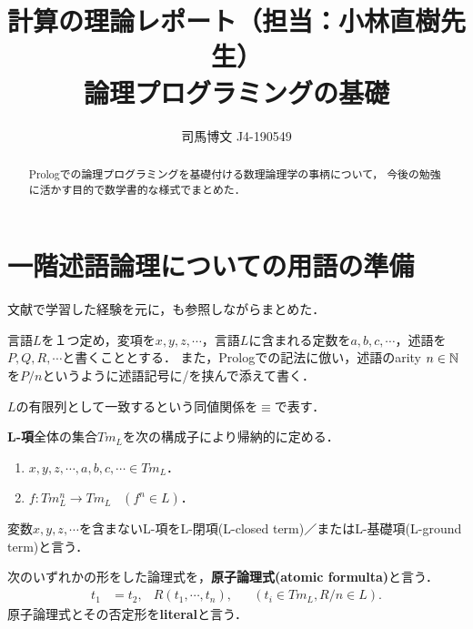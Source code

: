 \documentclass[uplatex,dvipdfmx]{jsarticle}
\title{計算の理論レポート（担当：小林直樹先生）\\論理プログラミングの基礎}
\author{司馬博文 J4-190549}
\begin{document}
\maketitle
\begin{abstract}
    Prologでの論理プログラミングを基礎付ける数理論理学の事柄について，
    今後の勉強に活かす目的で数学書的な様式でまとめた．
\end{abstract}
\tableofcontents
\vspace{2mm}

\section{一階述語論理についての用語の準備}
文献\cite{新井敏康}で学習した経験を元に，\cite{Horn clause}も参照しながらまとめた．

\begin{notation}
    言語$L$を１つ定め，変項を$x,y,z,\cdots$，言語$L$に含まれる定数を$a,b,c,\cdots$，述語を$P,Q,R,\cdots$と書くこととする．
    また，Prologでの記法に倣い，述語のarity $n\in\mathbb{N}$を$P/n$というように述語記号に/を挟んで添えて書く．

    $L$の有限列として一致するという同値関係を$\equiv$で表す．
\end{notation}

\begin{definition}[term]
    \textbf{L-項}全体の集合$Tm_L$を次の構成子により帰納的に定める．
    \begin{enumerate}
        \item  $x,y,z,\cdots,a,b,c,\cdots\in Tm_L$．
        \item  $f:Tm_L^n\to Tm_L\;\;\;(f^n\in L)$．
    \end{enumerate}
    変数$x,y,z,\cdots$を含まないL-項をL-閉項(L-closed term)／またはL-基礎項(L-ground term)と言う．
\end{definition}

\begin{definition}[literal]
    次のいずれかの形をした論理式を，\textbf{原子論理式(atomic formulta)}と言う．
    \begin{align*}
        t_1 &= t_2, & R(t_1,\cdots,t_n), && (t_i\in Tm_L, R/n\in L).
    \end{align*}
    原子論理式とその否定形を\textbf{literal}と言う．
\end{definition}
\end{document}
